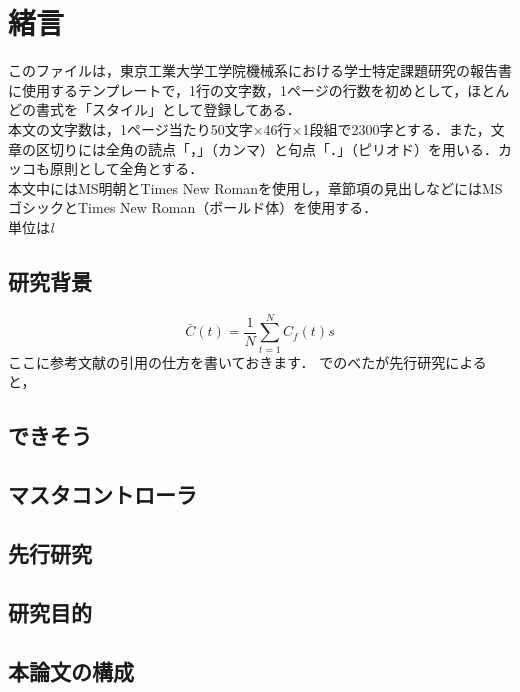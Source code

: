 \documentclass[./main]{subfiles}
\begin{document}
\section{緒言}
\label{sec: intro}
このファイルは，東京工業大学工学院機械系における学士特定課題研究の報告書に使用するテンプレートで，1行の文字数，1ページの行数を初めとして，ほとんどの書式を「スタイル」として登録してある．\\
本文の文字数は，1ページ当たり50文字×46行×1段組で2300字とする．また，文章の区切りには全角の読点「，」（カンマ）と句点「．」（ピリオド）を用いる．カッコも原則として全角とする．\\
本文中にはMS明朝とTimes New Romanを使用し，章節項の見出しなどにはMSゴシックとTimes New Roman（ボールド体）を使用する．\\
単位は\textit{l}
\subsection{研究背景}
\label{subsec: intro-background}
\begin{equation}
  \bar{C}(t)=\frac{1}{N}\sum^N_{t=1}C_f(t)s
  \label{eq: siki}
\end{equation}
ここに参考文献の引用の仕方を書いておきます．
\citep{白井大地:2013-09}でのべたが先行研究\citep{nin}によると，\citep{matloff__2012}
\subsection{できそう}
\label{subsec: intro-surgical_robot}


\subsection{マスタコントローラ}
\label{subsec: intro-master_controller}



\subsection{先行研究}
\label{subsec: intro-previous_research}



\subsection{研究目的}
\label{subsec: intro-purpose}


\subsection{本論文の構成}
\label{subsec: intro-contents}




\biblio
\end{document}
